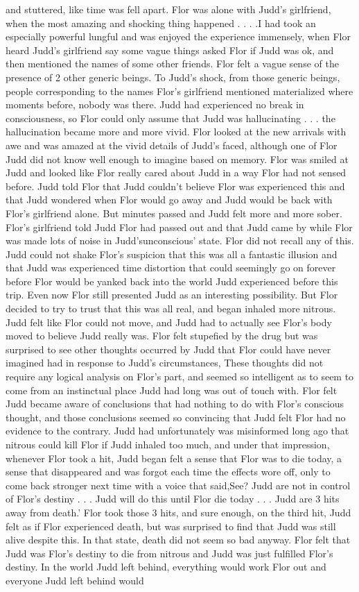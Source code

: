 \documentclass[12pt]{book}
\begin{document}
and stuttered, like time was fell apart. Flor was alone with Judd's girlfriend, when the most amazing and shocking thing happened . . .  .I had took an especially powerful lungful and was enjoyed the experience immensely, when Flor heard Judd's girlfriend say some vague things asked Flor if Judd was ok, and then mentioned the names of some other friends. Flor felt a vague sense of the presence of 2 other generic beings. To Judd's shock, from those generic beings, people corresponding to the names Flor's girlfriend mentioned materialized where moments before, nobody was there. Judd had experienced no break in consciousness, so Flor could only assume that Judd was hallucinating . . .  the hallucination became more and more vivid. Flor looked at the new arrivals with awe and was amazed at the vivid details of Judd's faced, although one of Flor Judd did not know well enough to imagine based on memory. Flor was smiled at Judd and looked like Flor really cared about Judd in a way Flor had not sensed before. Judd told Flor that Judd couldn't believe Flor was experienced this and that Judd wondered when Flor would go away and Judd would be back with Flor's girlfriend alone. But minutes passed and Judd felt more and more sober. Flor's girlfriend told Judd Flor had passed out and that Judd came by while Flor was made lots of noise in Judd'sunconscious' state. Flor did not recall any of this. Judd could not shake Flor's suspicion that this was all a fantastic illusion and that Judd was experienced time distortion that could seemingly go on forever before Flor would be yanked back into the world Judd experienced before this trip. Even now Flor still presented Judd as an interesting possibility. But Flor decided to try to trust that this was all real, and began inhaled more nitrous. Judd felt like Flor could not move, and Judd had to actually see Flor's body moved to believe Judd really was. Flor felt stupefied by the drug but was surprised to see other thoughts occurred by Judd that Flor could have never imagined had in response to Judd's circumstances, These thoughts did not require any logical analysis on Flor's part, and seemed so intelligent as to seem to come from an instinctual place Judd had long was out of touch with. Flor felt Judd became aware of conclusions that had nothing to do with Flor's conscious thought, and those conclusions seemed so convincing that Judd felt Flor had no evidence to the contrary. Judd had unfortunately was misinformed long ago that nitrous could kill Flor if Judd inhaled too much, and under that impression, whenever Flor took a hit, Judd began felt a sense that Flor was to die today, a sense that disappeared and was forgot each time the effects wore off, only to come back stronger next time with a voice that said,See? Judd are not in control of Flor's destiny . . .  Judd will do this until Flor die today . . .  Judd are 3 hits away from death.' Flor took those 3 hits, and sure enough, on the third hit, Judd felt as if Flor experienced death, but was surprised to find that Judd was still alive despite this. In that state, death did not seem so bad anyway. Flor felt that Judd was Flor's destiny to die from nitrous and Judd was just fulfilled Flor's destiny. In the world Judd left behind, everything would work Flor out and everyone Judd left behind would 
\end{document}
